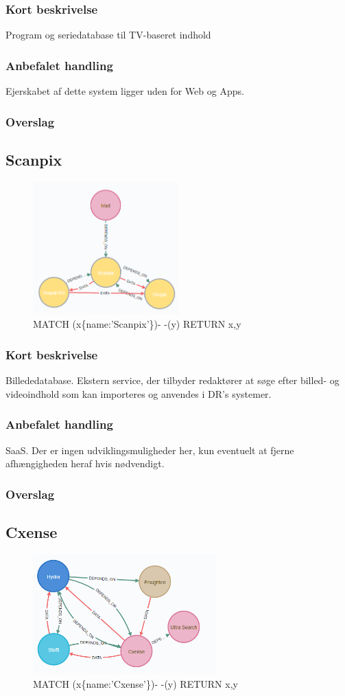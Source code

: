 \documentclass{article}
\begin{document}
\subsubsection{Kort beskrivelse}
Program og seriedatabase til TV-baseret indhold
\subsubsection{Anbefalet handling}
Ejerskabet af dette system ligger uden for Web og Apps.
\subsubsection{Overslag}


\subsection{Scanpix}
\begin{figure}[h]
\includegraphics[width=160pt]{Scanpix.PNG}
\caption{MATCH (x\{name:'Scanpix'\})- -(y) RETURN x,y}
\end{figure}
\subsubsection{Kort beskrivelse}
Billededatabase. Ekstern service, der tilbyder redaktører at søge efter billed- og videoindhold som kan importeres og anvendes i DR's systemer.
\subsubsection{Anbefalet handling}
SaaS. Der er ingen udviklingsmuligheder her, kun eventuelt at fjerne afhængigheden heraf hvis nødvendigt.
\subsubsection{Overslag}


\subsection{Cxense}
\begin{figure}[h]
\includegraphics[width=200pt]{Cxense.PNG}
\caption{MATCH (x\{name:'Cxense'\})- -(y) RETURN x,y}
\end{figure}
\end{document}
